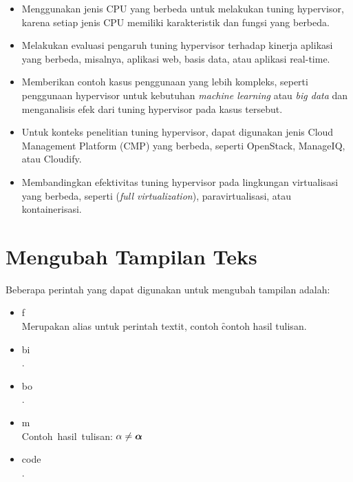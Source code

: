 \begin{itemize}
	\item Menggunakan jenis CPU yang berbeda untuk melakukan tuning hypervisor, karena setiap jenis CPU memiliki karakteristik dan fungsi yang berbeda.
	\item Melakukan evaluasi pengaruh tuning hypervisor terhadap kinerja aplikasi yang berbeda, misalnya, aplikasi web, basis data, atau aplikasi real-time.
	\item Memberikan contoh kasus penggunaan yang lebih kompleks, seperti penggunaan hypervisor untuk kebutuhan \textit{machine learning} atau \textit{big data} dan menganalisis efek dari tuning hypervisor pada kasus tersebut.
	\item Untuk konteks penelitian tuning hypervisor, dapat digunakan jenis Cloud Management Platform (CMP) yang berbeda, seperti OpenStack, ManageIQ, atau Cloudify.
	\item Membandingkan efektivitas tuning hypervisor pada lingkungan virtualisasi yang berbeda, seperti (\textit{full virtualization}), paravirtualisasi, atau kontainerisasi.
\end{itemize}

\iffalse
	\section{Mengubah Tampilan Teks}
	Beberapa perintah yang dapat digunakan untuk mengubah tampilan adalah:
	\begin{itemize}
		\item \bslash f \\
		      Merupakan alias untuk perintah \bslash textit, contoh
		      \f{contoh hasil tulisan}.
		\item \bslash bi \\
		      .
		\item \bslash bo \\
		      .
		\item \bslash m \\
		      Contoh\ hasil\ tulisan: $\alpha \not= \bm{\alpha}$
		\item \bslash code \\
		      .
	\end{itemize}


